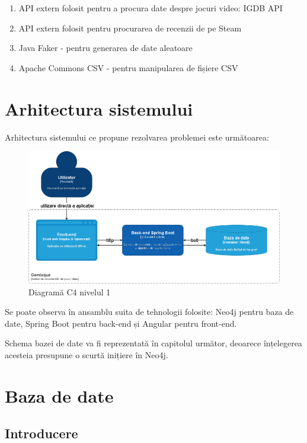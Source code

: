 \documentclass[12pt,a4paper]{report}
\begin{document}
\begin{enumerate}
  \item API extern folosit pentru a procura date despre jocuri video: IGDB API \cite{1}
  \item API extern folosit pentru procurarea de recenzii de pe Steam \cite{2}
  \item Java Faker - pentru generarea de date aleatoare \cite{3}
  \item Apache Commons CSV - pentru manipularea de fișiere CSV \cite{4}
\end{enumerate}

\newpage

\section{Arhitectura sistemului}

Arhitectura sistemului ce propune rezolvarea problemei este următoarea:

\begin{figure}[H]
\centering
\caption{}
\includegraphics[scale = 0.5]{exemplu_17_diagrama_c4_nivel_1.drawio}
\caption*{Diagramă C4 nivelul 1}
\end{figure}

Se poate observa în ansamblu suita de tehnologii folosite: Neo4j pentru baza de date, Spring Boot pentru back-end și Angular pentru front-end.

Schema bazei de date va fi reprezentată în capitolul următor, deoarece înțelegerea acesteia presupune o scurtă inițiere în  Neo4j.

\newpage


\section{Baza de date}
\subsection{Introducere}
\end{document}
